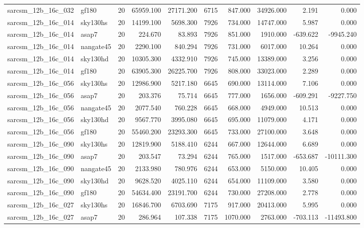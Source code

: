 \documentclass{article}
\begin{document}
\begin{longtable}{llrrrrrrrr}
sarcsm\_12b\_16c\_032 & gf180 & 20 & 65959.100 & 27171.200 & 6715 & 847.000 & 34926.000 & 2.191 & 0.000 \\
sarcsm\_12b\_16c\_014 & sky130hs & 20 & 14199.100 & 5698.300 & 7926 & 734.000 & 14747.000 & 5.987 & 0.000 \\
sarcsm\_12b\_16c\_014 & asap7 & 20 & 224.670 & 83.893 & 7926 & 851.000 & 1910.000 & -639.622 & -9945.240 \\
sarcsm\_12b\_16c\_014 & nangate45 & 20 & 2290.100 & 840.294 & 7926 & 731.000 & 6017.000 & 10.264 & 0.000 \\
sarcsm\_12b\_16c\_014 & sky130hd & 20 & 10305.300 & 4332.910 & 7926 & 745.000 & 13389.000 & 3.256 & 0.000 \\
sarcsm\_12b\_16c\_014 & gf180 & 20 & 63905.300 & 26225.700 & 7926 & 808.000 & 33023.000 & 2.289 & 0.000 \\
sarcsm\_12b\_16c\_056 & sky130hs & 20 & 12986.900 & 5217.180 & 6645 & 690.000 & 13114.000 & 7.106 & 0.000 \\
sarcsm\_12b\_16c\_056 & asap7 & 20 & 203.376 & 75.714 & 6645 & 777.000 & 1656.000 & -609.291 & -9227.750 \\
sarcsm\_12b\_16c\_056 & nangate45 & 20 & 2077.540 & 760.228 & 6645 & 668.000 & 4949.000 & 10.513 & 0.000 \\
sarcsm\_12b\_16c\_056 & sky130hd & 20 & 9567.770 & 3995.080 & 6645 & 695.000 & 11079.000 & 4.171 & 0.000 \\
sarcsm\_12b\_16c\_056 & gf180 & 20 & 55460.200 & 23293.300 & 6645 & 733.000 & 27100.000 & 3.648 & 0.000 \\
sarcsm\_12b\_16c\_090 & sky130hs & 20 & 12819.900 & 5188.410 & 6244 & 667.000 & 12644.000 & 6.689 & 0.000 \\
sarcsm\_12b\_16c\_090 & asap7 & 20 & 203.547 & 73.294 & 6244 & 765.000 & 1517.000 & -653.687 & -10111.300 \\
sarcsm\_12b\_16c\_090 & nangate45 & 20 & 2133.980 & 780.976 & 6244 & 653.000 & 5150.000 & 10.405 & 0.000 \\
sarcsm\_12b\_16c\_090 & sky130hd & 20 & 9628.520 & 4025.110 & 6244 & 654.000 & 11109.000 & 3.580 & 0.000 \\
sarcsm\_12b\_16c\_090 & gf180 & 20 & 54634.400 & 23191.700 & 6244 & 730.000 & 27208.000 & 2.778 & 0.000 \\
sarcsm\_12b\_16c\_027 & sky130hs & 20 & 16846.700 & 6703.690 & 7175 & 917.000 & 20413.000 & 5.995 & 0.000 \\
sarcsm\_12b\_16c\_027 & asap7 & 20 & 286.964 & 107.338 & 7175 & 1070.000 & 2763.000 & -703.113 & -11493.800 \\

\end{longtable}
\end{document}
